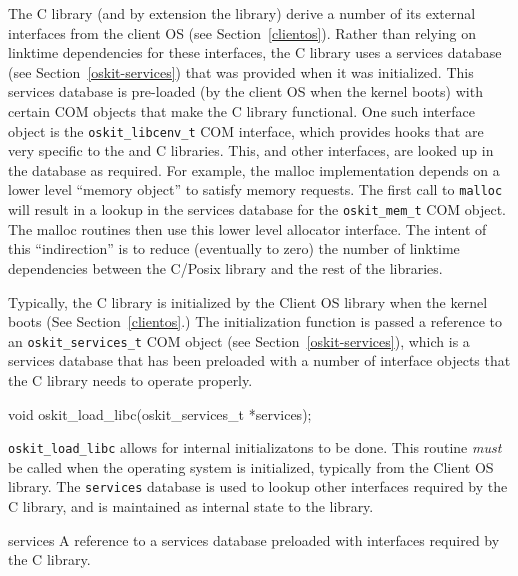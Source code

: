 The \freebsd{} C library (and by extension the \posix{} library) derive a
number of its external interfaces from the client OS (see
Section~\ref{clientos}).
Rather than relying on linktime dependencies for these
interfaces, the C library uses a services database (see
Section~\ref{oskit-services}) that was provided when it was initialized. This
services database is pre-loaded (by the client OS when the kernel boots)
with certain COM objects that make the C library functional. One such
interface object is the \texttt{oskit_libcenv_t} COM interface, which
provides hooks that are very specific to the \posix{} and C libraries. This,
and other interfaces, are looked up in the database as required.  For
example, the malloc implementation depends on a lower level ``memory
object'' to satisfy memory requests. The first call to \texttt{malloc} will
result in a lookup in the services database for the \texttt{oskit_mem_t}
COM object. The malloc routines then use this lower level allocator
interface. The intent of this ``indirection'' is to reduce (eventually to
zero) the number of linktime dependencies between the C/Posix library and
the rest of the \oskit{} libraries.


Typically, the C library is initialized by the Client OS library when the
kernel boots (See Section~\ref{clientos}.) The initialization function is
passed a reference to an \texttt{oskit_services_t} COM object (see
Section~\ref{oskit-services}),
which is a services database that has been preloaded
with a number of interface objects that the C library needs to operate
properly. 

%
\label{oskit-init-freebsd-libc}
\begin{apisyn}

        \funcproto void oskit_load_libc(oskit_services_t *services);
\end{apisyn}
\begin{apidesc}
	\texttt{oskit_load_libc} allows for internal initializatons to be
	done. This routine \emph{must} be called when the operating system is
	initialized, typically from the Client OS library. The
	\texttt{services} database is used to lookup other interfaces
	required by the C library, and is maintained as internal state to
	the library. 
\end{apidesc}
\begin{apiparm}
	\item[services] A reference to a services database preloaded with
	interfaces required by the C library.
\end{apiparm}

